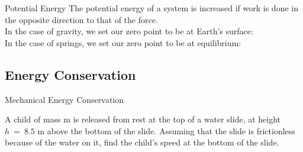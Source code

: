 \begin{frame}{Potential Energy}
\small
The potential energy of a system is increased if work is done in the opposite direction to that of the force.\\[2ex]

In the case of gravity, we set our zero point to be at Earth's surface:\\[15ex]


In the case of springs, we set our zero point to be at equilibrium:\\[15ex]


\end{frame}



 \subsection{Energy Conservation}

\begin{frame}{Mechanical Energy Conservation}
\small

A child of mass m is released from rest at the top of a water slide, at height $h~=~8.5$ m above the bottom of the slide. Assuming that the slide is frictionless because of the water on it, find the child's speed at the bottom of the slide.\\[2ex]






\vspace{10cm}
\end{frame}

